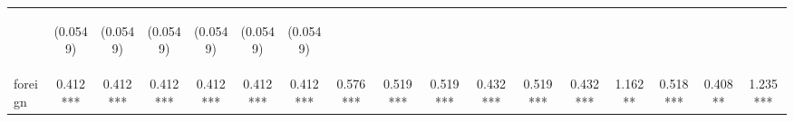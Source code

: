 \begin{center}
\begin{tabular}{lcccccccccccccccc}
\vspace{4pt} & \begin{footnotesize}(0.0549)\end{footnotesize} & \begin{footnotesize}(0.0549)\end{footnotesize} & \begin{footnotesize}(0.0549)\end{footnotesize} & \begin{footnotesize}(0.0549)\end{footnotesize} & \begin{footnotesize}(0.0549)\end{footnotesize} & \begin{footnotesize}(0.0549)\end{footnotesize} & \begin{footnotesize}\end{footnotesize} & \begin{footnotesize}\end{footnotesize} & \begin{footnotesize}\end{footnotesize} & \begin{footnotesize}\end{footnotesize} & \begin{footnotesize}\end{footnotesize} & \begin{footnotesize}\end{footnotesize} & \begin{footnotesize}\end{footnotesize} & \begin{footnotesize}\end{footnotesize} & \begin{footnotesize}\end{footnotesize} & \begin{footnotesize}\end{footnotesize} \\
foreign & 0.412*** & 0.412*** & 0.412*** & 0.412*** & 0.412*** & 0.412*** & 0.576*** & 0.519*** & 0.519*** & 0.432*** & 0.519*** & 0.432*** & 1.162** & 0.518*** & 0.408** & 1.235*** \\

\end{tabular}
\end{center}
